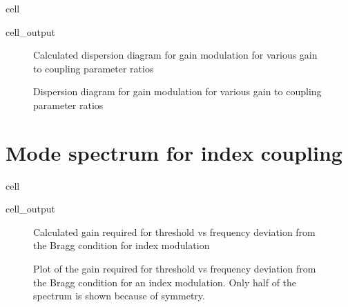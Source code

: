 \documentclass[a4paper,10pt,english,openany,oneside]{jupyterBook}
\begin{document}
\begin{sphinxuseclass}{cell}\begin{sphinxVerbatimOutput}

\begin{sphinxuseclass}{cell_output}
\begin{figure}[htbp]
\centering
\capstart

\noindent{}
\caption{Calculated dispersion diagram for gain modulation for various gain to coupling parameter ratios}\label{\detokenize{Kogelnik-Shank_Coupled-Wave-Theory_DFB-Lasers:kogelnik3}}\end{figure}

\end{sphinxuseclass}\end{sphinxVerbatimOutput}

\end{sphinxuseclass}
\begin{figure}[htbp]
\centering
\capstart

\noindent{}
\caption{Dispersion diagram for gain modulation for various gain to coupling parameter ratios}\label{\detokenize{Kogelnik-Shank_Coupled-Wave-Theory_DFB-Lasers:kogelnik4}}\end{figure}


\section{Mode spectrum for index coupling}
\label{\detokenize{Kogelnik-Shank_Coupled-Wave-Theory_DFB-Lasers:mode-spectrum-for-index-coupling}}
\begin{sphinxuseclass}{cell}\begin{sphinxVerbatimOutput}

\begin{sphinxuseclass}{cell_output}
\begin{figure}[htbp]
\centering
\capstart

\noindent{}
\caption{Calculated gain required for threshold vs frequency deviation from the Bragg condition for index modulation}\label{\detokenize{Kogelnik-Shank_Coupled-Wave-Theory_DFB-Lasers:kogelnik5c}}\end{figure}

\end{sphinxuseclass}\end{sphinxVerbatimOutput}

\end{sphinxuseclass}
\begin{figure}[htbp]
\centering
\capstart

\noindent{}
\caption{Plot of the gain required for threshold vs frequency deviation from the Bragg condition for an index modulation. Only half of the spectrum is shown because of symmetry.}\label{\detokenize{Kogelnik-Shank_Coupled-Wave-Theory_DFB-Lasers:kogelnik5}}\end{figure}
\end{document}
